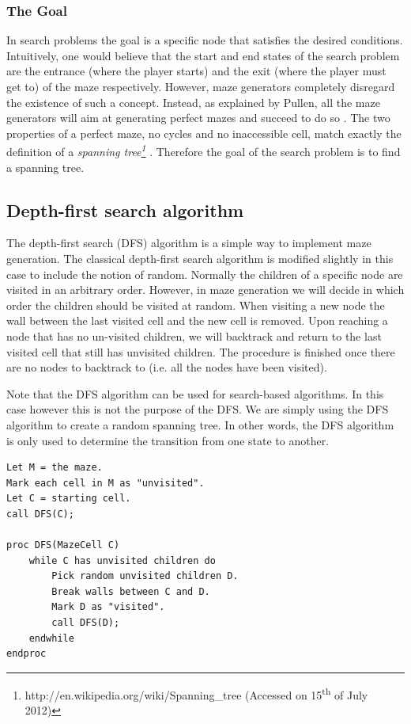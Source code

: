 \subsubsection{The Goal}
In search problems the goal is a specific node that satisfies the desired conditions. Intuitively, one would believe that the start and end states of the search problem are the entrance (where the player starts) and the exit (where the player must get to) of the maze respectively. However, maze generators completely disregard the existence of such a concept. Instead, as explained by Pullen, all the maze generators will aim at generating perfect mazes and succeed to do so \citep{ThinkLabyrinth}. The two properties of a perfect maze, no cycles and no inaccessible cell, match exactly the definition of a {\em spanning tree\footnote{http://en.wikipedia.org/wiki/Spanning\_tree (Accessed on 15\textsuperscript{th} of July 2012)}} \citep{DBLP:journals/siamdm/Aldous90}. Therefore the goal of the search problem is to find a spanning tree.

\subsection{Depth-first search algorithm}
The depth-first search (DFS) algorithm is a simple way to implement maze generation. The classical depth-first search algorithm is modified slightly in this case to include the notion of random. Normally the children of a specific node are visited in an arbitrary order. However, in maze generation we will decide in which order the children should be visited at random. When visiting a new node the wall between the last visited cell and the new cell is removed. Upon reaching a node that has no un-visited children, we will backtrack and return to the last visited cell that still has unvisited children. The procedure is finished once there are no nodes to backtrack to (i.e. all the nodes have been visited).

Note that the DFS algorithm can be used for search-based algorithms. In this case however this is not the purpose of the DFS. We are simply using the DFS algorithm to create a random spanning tree. In other words, the DFS algorithm is only used to determine the transition from one state to another.

\lstAlgo
\begin{lstlisting}
Let M = the maze.
Mark each cell in M as "unvisited".
Let C = starting cell.
call DFS(C);

proc DFS(MazeCell C)
	while C has unvisited children do
		Pick random unvisited children D.
		Break walls between C and D.
		Mark D as "visited".
		call DFS(D);
	endwhile
endproc
\end{lstlisting}

